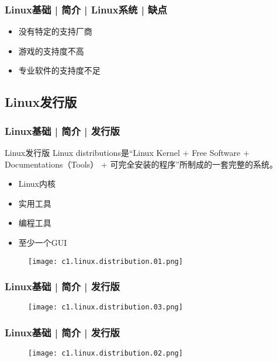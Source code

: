 \begin{frame}
  \frametitle{Linux基础 | 简介 | Linux系统 | 缺点}
  \begin{itemize}
    \item 没有特定的支持厂商
    \item 游戏的支持度不高
    \item 专业软件的支持度不足
  \end{itemize}
\end{frame}

\subsection{Linux发行版}
\begin{frame}
  \frametitle{Linux基础 | 简介 | 发行版}
  \begin{block}{Linux发行版}
    Linux distributions是“Linux Kernel + Free Software + Documentations（Tools） + 可完全安装的程序”所制成的一套完整的系统。
    \begin{itemize}
      \item Linux内核
      \item 实用工具
      \item 编程工具
      \item 至少一个GUI
    \end{itemize}
  \end{block}
  \pause
  \begin{figure}
    \centering
    \texttt{[image: c1.linux.distribution.01.png]}
  \end{figure}
\end{frame}

\begin{frame}
  \frametitle{Linux基础 | 简介 | 发行版}
  \begin{figure}
    \centering
    \texttt{[image: c1.linux.distribution.03.png]}
  \end{figure}
\end{frame}

\begin{frame}
  \frametitle{Linux基础 | 简介 | 发行版}
  \begin{figure}
    \centering
    \texttt{[image: c1.linux.distribution.02.png]}
  \end{figure}
\end{frame}

